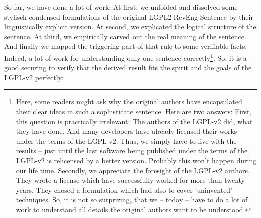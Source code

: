 %
%
%
%
%

So far, we have done a lot of work: At first, we unfolded and dissolved some
stylisch condensed formulations of the original LGPL2-RevEng-Sentence by their
linguistically explicit version. At second, we explicated the logical structure
of the sentence. At third, we empirically carved out the real meaning of the
sentence. And finally we mapped the triggering part of that rule to some
verifiable facts. Indeed, a lot of work for understanding only one sentence
correctly\footnote{Here, some readers might ask why the original authors have
encapsulated their clear ideas in such a sophisticate sentence. Here are two
answers: First, this question is practically irrelevant: The authors of the
LGPL-v2 did, what they have done. And many developers have already licensed
their works under the terms of the LGPL-v2. Thus, we simply have to live with
the results -- just until the last software being published under the terms of
the LGPL-v2 is relicensed by a better version. Probably this won't happen during
our life time. Secondly, we appreciate the foresight of the LGPL-v2 authors.
They wrote a license which have successfully worked for more than twenty years.
They chosed a formulation which had also to cover 'uninvented' techniques. So,
it is not so surprizing, that we -- today -- have to do a lot of work to
understand all details the original authors want to be understood.}. So, it is a
good securing to verify that the derived result fits the spirit and the goals of
the LGPL-v2 perfectly:

